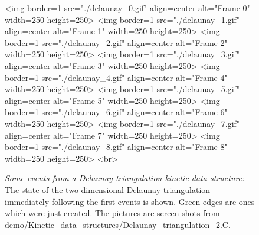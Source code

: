 \begin{figure}[htb]
\begin{ccHtmlOnly}
<img border=1 src="./delaunay_0.gif" align=center alt="Frame 0" width=250 height=250>
<img border=1 src="./delaunay_1.gif" align=center alt="Frame 1" width=250 height=250>
<img border=1 src="./delaunay_2.gif" align=center alt="Frame 2" width=250 height=250>
<img border=1 src="./delaunay_3.gif" align=center alt="Frame 3" width=250 height=250>
<img border=1 src="./delaunay_4.gif" align=center alt="Frame 4" width=250 height=250>
<img border=1 src="./delaunay_5.gif" align=center alt="Frame 5" width=250 height=250>
<img border=1 src="./delaunay_6.gif" align=center alt="Frame 6" width=250 height=250>
<img border=1 src="./delaunay_7.gif" align=center alt="Frame 7" width=250 height=250>
<img border=1 src="./delaunay_8.gif" align=center alt="Frame 8" width=250 height=250>
<br>
\end{ccHtmlOnly}
\caption{ \label{fig:delaunay_events} 
{\em Some events from a Delaunay triangulation kinetic data
structure:} The state of the two dimensional Delaunay triangulation
immediately following the first events is shown. Green edges are ones
which were just created. The pictures are screen shots from
demo/Kinetic\_data\_structures/Delaunay\_triangulation\_2.C. }
\end{figure}


